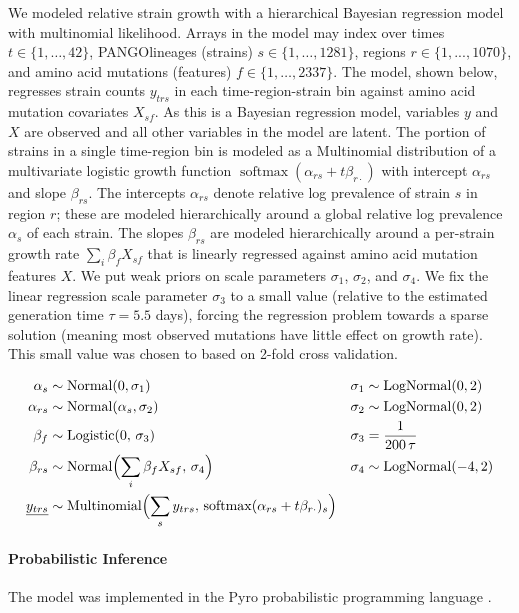 \documentclass[12pt]{article}
\begin{document}
We modeled relative strain growth with a hierarchical Bayesian regression model with multinomial likelihood.
Arrays in the model may index over times $t\in \{1,\dots,42\}$, PANGOlineages (strains) $s\in\{1,\dots,1281\}$, regions $r\in\{1,...,1070\}$, and amino acid mutations (features) $f\in\{1,\dots,2337\}$.
The model, shown below, regresses strain counts $y_{trs}$ in each time-region-strain bin against amino acid mutation covariates $X_{sf}$.
As this is a Bayesian regression model, variables $y$ and $X$ are observed and all other variables in the model are latent.
The portion of strains in a single time-region bin is modeled as a Multinomial distribution of a multivariate logistic growth function $\operatorname{softmax}(\alpha_{rs} + t\beta_{r\cdot})$ with intercept $\alpha_{rs}$ and slope $\beta_{rs}$.
The intercepts $\alpha_{rs}$ denote relative log prevalence of strain $s$ in region $r$; these are modeled hierarchically around a global relative log prevalence $\alpha_s$ of each strain.
The slopes $\beta_{rs}$ are modeled hierarchically around a per-strain growth rate $\sum_i \beta_f X_{sf}$ that is linearly regressed against amino acid mutation features $X$.
We put weak priors on scale parameters $\sigma_1$, $\sigma_2$, and $\sigma_4$.
We fix the linear regression scale parameter $\sigma_3$ to a small value (relative to the estimated generation time $\tau=5.5$ days), forcing the regression problem towards a sparse solution (meaning most observed mutations have little effect on growth rate).
This small value was chosen to based on 2-fold cross validation.

\begin{align*}
  \textstyle
  \alpha_s &\sim \operatorname{Normal}(0, \sigma_1) &
  \sigma_1 &\sim \operatorname{LogNormal}(0, 2) \\
  \alpha_{rs} &\sim \operatorname{Normal}(\alpha_s, \sigma_2) &
  \sigma_2 &\sim \operatorname{LogNormal}(0, 2) \\
  \beta_f &\sim \operatorname{Logistic}(0,\, \sigma_3) &
  \sigma_3 &= \frac{1}{200\, \tau} \\
  \beta_{rs} &\sim \operatorname{Normal}\Bigl(
   \sum_i \beta_f X_{sf},\, \sigma_4
  \Bigr) &
  \sigma_4 &\sim \operatorname{LogNormal}(-4, 2) \\
  \underline{y_{trs}} &\sim \operatorname{Multinomial}\Bigl(
    \sum_s y_{trs},\, \operatorname{softmax}(\alpha_{rs} + t \beta_{r\cdot})_s
  \Bigr)
\end{align*}

\paragraph*{Probabilistic Inference}

The model was implemented in the Pyro probabilistic programming language \cite{bingham2019pyro}.




\end{document}
